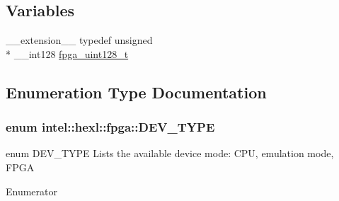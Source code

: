 \subsection*{Variables}
\begin{DoxyCompactItemize}
\item 
\-\_\-\-\_\-extension\-\_\-\-\_\- typedef unsigned \\*
\-\_\-\-\_\-int128 \hyperlink{namespaceintel_1_1hexl_1_1fpga_abec5370ea5966ed3c9aee7817e805337}{fpga\-\_\-uint128\-\_\-t}
\end{DoxyCompactItemize}


\subsection{Enumeration Type Documentation}
\hypertarget{namespaceintel_1_1hexl_1_1fpga_a1a264f07facc5f24376170ea052e4fbc}{
\subsubsection[{D\-E\-V\-\_\-\-T\-Y\-P\-E}]{\setlength{\rightskip}{0pt plus 5cm}enum {\bf intel\-::hexl\-::fpga\-::\-D\-E\-V\-\_\-\-T\-Y\-P\-E}}}\label{namespaceintel_1_1hexl_1_1fpga_a1a264f07facc5f24376170ea052e4fbc}


enum D\-E\-V\-\_\-\-T\-Y\-P\-E Lists the available device mode\-: C\-P\-U, emulation mode, F\-P\-G\-A 

\begin{Desc}
\item[Enumerator]\par
\begin{description}
\item[{\em 
\hypertarget{namespaceintel_1_1hexl_1_1fpga_a1a264f07facc5f24376170ea052e4fbca665be2b62dd76ce44231d0503e468464}{N\-O\-N\-E}\label{namespaceintel_1_1hexl_1_1fpga_a1a264f07facc5f24376170ea052e4fbca665be2b62dd76ce44231d0503e468464}
}]\item[{\em 
\hypertarget{namespaceintel_1_1hexl_1_1fpga_a1a264f07facc5f24376170ea052e4fbca6553acb72b13a76b0cf31197badbc164}{E\-M\-U}\label{namespaceintel_1_1hexl_1_1fpga_a1a264f07facc5f24376170ea052e4fbca6553acb72b13a76b0cf31197badbc164}
}]\item[{\em 
\hypertarget{namespaceintel_1_1hexl_1_1fpga_a1a264f07facc5f24376170ea052e4fbca7fef8fda7839a871ec648c0283640975}{F\-P\-G\-A}\label{namespaceintel_1_1hexl_1_1fpga_a1a264f07facc5f24376170ea052e4fbca7fef8fda7839a871ec648c0283640975}
}]\end{description}
\end{Desc}


